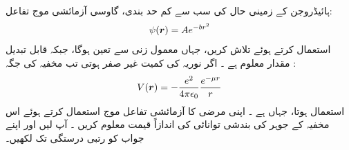 ہائیڈروجن کے  زمینی حال کی سب سے کم حد بندی،  گاوسی آزمائشی  موج تفاعل:
\begin{align*}
\psi({{\boldsymbol{r}}})=Ae^{-br^{2}} 
\end{align*}
 استعمال کرتے ہوئے تلاش کریں،  جہاں   معمول زنی سے    تعین ہوگا، جبکہ   قابل تبدیل مقدار معلوم ہے ۔    
اگر نوریہ کی کمیت غیر صفر  ہوتی تب مخفیہ کی جگہ : 
\begin{align}
V({{\boldsymbol{r}}})=-\frac{e^{2}}{4\pi\epsilon_{0}}\frac{e^{-\mu r}}{r} 
\end{align}
 استعمال ہوتا، جہاں  ہے ۔ اپنی مرضی کا  آزمائشی  تفاعل موج استعمال کرتے ہوئے اس مخفیہ کے    جوہر کی بندشی توانائی کی اندازاً  قیمت معلوم کریں ۔ آپ  لیں اور اپنے جواب کو  رتبی درستگی تک لکھیں۔
 
